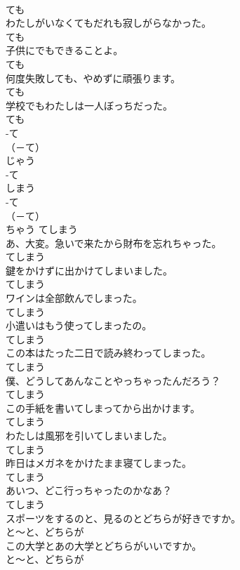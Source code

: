 \documentclass[8pt]{extreport}
\begin{document}
\begin{CJK}{UTF8}{min}
\\	ても
\\	わたしがいなくてもだれも寂しがらなかった。	
\\	ても
\\	子供にでもできることよ。	
\\	ても
\\	何度失敗しても、やめずに頑張ります。	
\\	ても
\\	学校でもわたしは一人ぼっちだった。	
\\	ても
\\	-て
\\	（－て） 
\\	じゃう	
\\	-て
\\	しまう	
\\	-て
\\	（－て） 
\\	ちゃう	てしまう
\\	あ、大変。急いで来たから財布を忘れちゃった。	
\\	てしまう
\\	鍵をかけずに出かけてしまいました。	
\\	てしまう
\\	ワインは全部飲んでしまった。	
\\	てしまう
\\	小遣いはもう使ってしまったの。	
\\	てしまう
\\	この本はたった二日で読み終わってしまった。	
\\	てしまう
\\	僕、どうしてあんなことやっちゃったんだろう？	
\\	てしまう
\\	この手紙を書いてしまってから出かけます。	
\\	てしまう
\\	わたしは風邪を引いてしまいました。	
\\	てしまう
\\	昨日はメガネをかけたまま寝てしまった。	
\\	てしまう
\\	あいつ、どこ行っちゃったのかなあ？	
\\	てしまう
\\	スポーツをするのと、見るのとどちらが好きですか。	
\\	と～と、どちらが
\\	この大学とあの大学とどちらがいいですか。	
\\	と～と、どちらが

\end{CJK}
\end{document}
